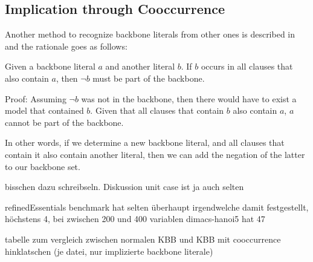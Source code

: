 \subsection{Implication through Cooccurrence}
\label{subsec:coocc}
Another method to recognize backbone literals from other ones is described in \cite{wbxcl16} and the rationale goes as follows:
\begin{lemma}
Given a backbone literal $a$ and another literal $b$. If $b$ occurs in all clauses that also contain $a$, then $\neg b$ must be part of the backbone. 

Proof: Assuming $\neg b$ was not in the backbone, then there would have to exist a model that contained $b$. Given that all clauses that contain $b$ also contain $a$, $a$ cannot be part of the backbone.
\end{lemma}

In other words, if we determine a new backbone literal, and all clauses that contain it also contain another literal, then we can add the negation of the latter to our backbone set. 

bisschen dazu schreibseln. Diskussion unit case ist ja auch selten

refinedEssentials benchmark hat selten überhaupt irgendwelche damit festgestellt, höchstens 4, bei zwischen 200 und 400 variablen
dimacs-hanoi5 hat 47

tabelle zum vergleich zwischen normalen KBB und KBB mit cooccurrence hinklatschen (je datei, nur implizierte backbone literale)

